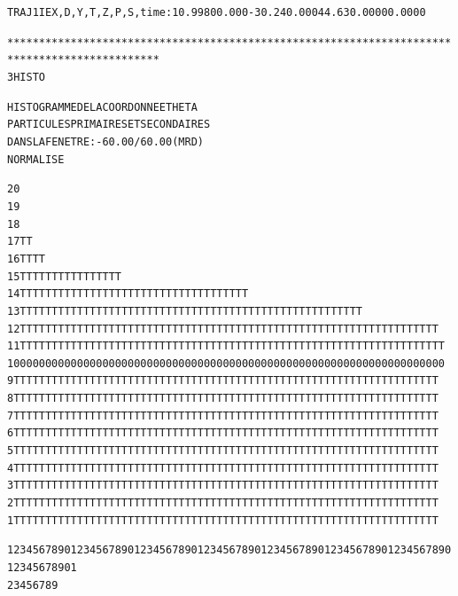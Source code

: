 \begin{tiny}
\begin{center}
\begin{alltt}
 TRAJ 1 IEX,D,Y,T,Z,P,S,time :  1  0.9980  0.000 -30.24   0.000   44.63   0.0000   0.0000    

**********************************************************************************************
      3  HISTO                         
                
                      HISTOGRAMME  DE  LA  COORDONNEE  THETA 
                      PARTICULES  PRIMAIRES  ET  SECONDAIRES
                      DANS  LA  FENETRE :   -60.00     /    60.00     (MRD)
                              NORMALISE     

   20                                                                                                
   19                                                                                                
   18                                                                                                
   17                                                                      T              T          
   16                   T                             T            T              T          
   15                 T T    T      TT         T      T   T   T  T T   T       TT TT         
   14                TT T   TT   T  TTTT TT    T     TTTTTT TTTT TTTT  TT T   TTT TTT        
   13               TTTTTT TTTTTTT TTTTT TTT TTT T   TTTTTTTTTTTTTTTT TTTTT   TTTTTTTT       
   12               TTTTTTTTTTTTTTTTTTTTTTTTTTTTTTTTTTTTTTTTTTTTTTTTTTTTTTTTTTTTTTTTTT       
   11              TTTTTTTTTTTTTTTTTTTTTTTTTTTTTTTTTTTTTTTTTTTTTTTTTTTTTTTTTTTTTTTTTTT       
   10              0000000000000000000000000000000000000000000000000000000000000000000       
    9              TTTTTTTTTTTTTTTTTTTTTTTTTTTTTTTTTTTTTTTTTTTTTTTTTTTTTTTTTTTTTTTTTTT       
    8              TTTTTTTTTTTTTTTTTTTTTTTTTTTTTTTTTTTTTTTTTTTTTTTTTTTTTTTTTTTTTTTTTTT       
    7              TTTTTTTTTTTTTTTTTTTTTTTTTTTTTTTTTTTTTTTTTTTTTTTTTTTTTTTTTTTTTTTTTTT       
    6              TTTTTTTTTTTTTTTTTTTTTTTTTTTTTTTTTTTTTTTTTTTTTTTTTTTTTTTTTTTTTTTTTTT       
    5              TTTTTTTTTTTTTTTTTTTTTTTTTTTTTTTTTTTTTTTTTTTTTTTTTTTTTTTTTTTTTTTTTTT       
    4              TTTTTTTTTTTTTTTTTTTTTTTTTTTTTTTTTTTTTTTTTTTTTTTTTTTTTTTTTTTTTTTTTTT       
    3              TTTTTTTTTTTTTTTTTTTTTTTTTTTTTTTTTTTTTTTTTTTTTTTTTTTTTTTTTTTTTTTTTTT       
    2              TTTTTTTTTTTTTTTTTTTTTTTTTTTTTTTTTTTTTTTTTTTTTTTTTTTTTTTTTTTTTTTTTTT       
    1              TTTTTTTTTTTTTTTTTTTTTTTTTTTTTTTTTTTTTTTTTTTTTTTTTTTTTTTTTTTTTTTTTTT
                   
            123456789012345678901234567890123456789012345678901234567890123456789012345678901
                     2         3         4         5         6         7         8         9


\end{alltt}
\end{center}
\end{tiny}
